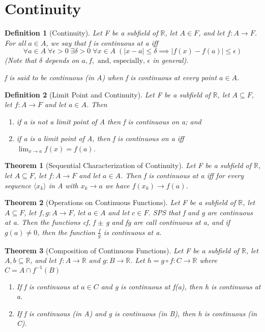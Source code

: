 \documentclass[11pt, oneside]{book}
\theoremstyle{break}
\newtheorem{thm}{Theorem}[section]
\newtheorem{defn}{Definition}[section]
\newcommand{\bb}[1]{\mathbb{#1}}		%
\begin{document}
\section{Continuity}

\begin{defn}[Continuity]
	Let F be a subfield of $\bb{R}$, let $A \in F$, and let $f: A \to F$. For all $a \in A$, we say that f is continuous at a iff
	\[
		\forall a \in A \; \forall \epsilon > 0 \; \exists \delta > 0 \; \forall x \in A \; (|x - a| \leq \delta \implies |f(x) - f(a)| \leq \epsilon)
	\]
	(Note that $\delta$ depends on $a, f, \text{ and, especially, } \epsilon$ in general).

	f is said to be continuous (in A) when f is continuous at every point $a \in A$.
\end{defn}

\begin{defn}[Limit Point and Continuity]
	Let F be a subfield of $\bb{R}$, let $A \subseteq F$, let $f: A \to F$ and let $a \in A$. Then
	\begin{enumerate}
		\item if a is not a limit point of A then f is continuous on a; and
		\item if a is a limit point of A, then f is continuous on a iff $\lim_{x \to a} f(x) = f(a)$.
	\end{enumerate}
\end{defn}

\begin{thm}[Sequential Characterization of Continuity]
	Let F be a subfield of $\bb{R}$, let $A \subseteq F$, let $f: A \to F$ and let $a \in A$. Then f is continuous at a iff for every sequence $\langle x_k \rangle$ in A with $x_k \to a$ we have $f(x_k) \to f(a)$.
\end{thm}

\begin{thm}[Operations on Continuous Functions]
	Let F be a subfield of $\bb{R}$, let $A \subseteq F$, let $f, g: A \to F$, let $a \in A$ and let $c \in F$. SPS that f and g are continuous at a. Then the functions cf, f $\pm$ g and fg are call continuous at a, and if $g(a) \neq 0$, then the function $\frac{f}{g}$ is continuous at a.
\end{thm}

\begin{thm}[Composition of Continuous Functions]
	Let F be a subfield of $\bb{R}$, let $A, b \subseteq \bb{R}$, and let $f: A \to \bb{R}$ and $g: B \to \bb{R}$. Let $h = g \circ f : C \to \bb{R}$ where $C = A \cap f^{-1}(B)$
	\begin{enumerate}
		\item If f is continuous at $a \in C$ and g is continuous at f(a), then h is continuous at a.
		\item If f is continuous (in A) and g is continuous (in B), then h is continuous (in C).
	\end{enumerate}
\end{thm}
\end{document}

